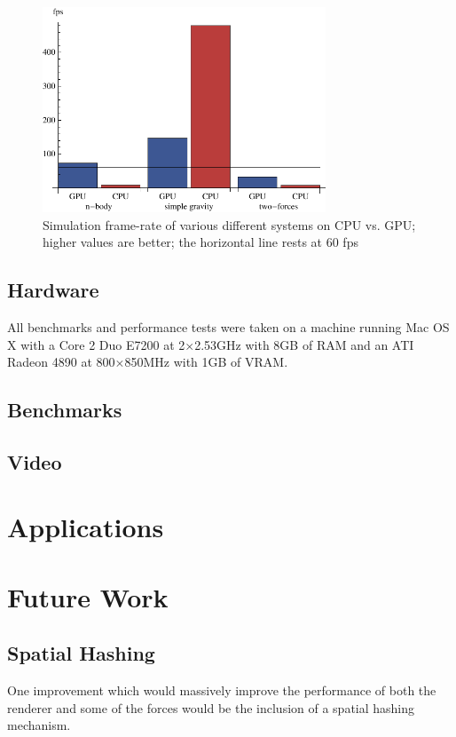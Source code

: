 \documentclass{acmsiggraph}
\begin{document}
\begin{figure}
    \includegraphics[width=84.5mm]{basicSpeedPlot.pdf}
    \caption{Simulation frame-rate of various different systems on CPU vs. GPU; higher values are better; the horizontal line rests at 60 fps}
    \label{fig:basicSpeedPlot}
\end{figure}

\subsection{Hardware}

All benchmarks and performance tests were taken on a machine running Mac OS X with a Core 2 Duo E7200 at 2$\times$2.53GHz with 8GB of RAM and an ATI Radeon 4890 at 800$\times$850MHz with 1GB of VRAM.

\subsection{Benchmarks}

\subsection{Video}

\section{Applications}

\section{Future Work}

\subsection{Spatial Hashing}

One improvement which would massively improve the performance of both the renderer and some of the forces would be the inclusion of a spatial hashing mechanism.
\end{document}
